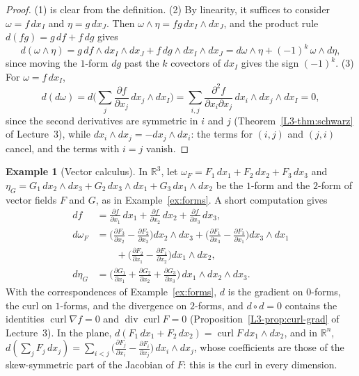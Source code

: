 \documentclass[11pt]{article}
\theoremstyle{definition}
\newtheorem{example}[definition]{Example}
\theoremstyle{plain}
\theoremstyle{remark}
\DeclareMathOperator{\Div}{div}
\DeclareMathOperator{\curl}{curl}
\begin{document}
\begin{proof}
    (1) is clear from the definition. (2) By linearity, it suffices to consider $\omega = f\, dx_I$ and $\eta = g\, dx_J$. Then $\omega \wedge \eta = fg\, dx_I \wedge dx_J$, and the product rule $d(fg) = g\, df + f\, dg$ gives
    \[d(\omega \wedge \eta) = g\, df \wedge dx_I \wedge dx_J + f\, dg \wedge dx_I \wedge dx_J = d\omega \wedge \eta + (-1)^k\, \omega \wedge d\eta,\]
    since moving the $1$-form $dg$ past the $k$ covectors of $dx_I$ gives the sign $(-1)^k$. (3) For $\omega = f\, dx_I$,
    \[d(d\omega) = d\Big(\sum_j \frac{\partial f}{\partial x_j}\, dx_j \wedge dx_I\Big) = \sum_{i,j} \frac{\partial^2 f}{\partial x_i \partial x_j}\, dx_i \wedge dx_j \wedge dx_I = 0,\]
    since the second derivatives are symmetric in $i$ and $j$ (Theorem~\ref{L3-thm:schwarz} of Lecture~3), while $dx_i \wedge dx_j = -dx_j \wedge dx_i$: the terms for $(i, j)$ and $(j, i)$ cancel, and the terms with $i = j$ vanish.
\end{proof}

\begin{example}[Vector calculus]\label{ex:vector-calculus-forms}
    In $\mathbb{R}^3$, let $\omega_F = F_1\, dx_1 + F_2\, dx_2 + F_3\, dx_3$ and $\eta_G = G_1\, dx_2 \wedge dx_3 + G_2\, dx_3 \wedge dx_1 + G_3\, dx_1 \wedge dx_2$ be the $1$-form and the $2$-form of vector fields $F$ and $G$, as in Example~\ref{ex:forms}. A short computation gives
    \begin{align*}
        df &= \tfrac{\partial f}{\partial x_1}\, dx_1 + \tfrac{\partial f}{\partial x_2}\, dx_2 + \tfrac{\partial f}{\partial x_3}\, dx_3, \\
        d\omega_F &= \Big(\tfrac{\partial F_3}{\partial x_2} - \tfrac{\partial F_2}{\partial x_3}\Big) dx_2 \wedge dx_3 + \Big(\tfrac{\partial F_1}{\partial x_3} - \tfrac{\partial F_3}{\partial x_1}\Big) dx_3 \wedge dx_1 \\
        &\qquad + \Big(\tfrac{\partial F_2}{\partial x_1} - \tfrac{\partial F_1}{\partial x_2}\Big) dx_1 \wedge dx_2, \\
        d\eta_G &= \Big(\tfrac{\partial G_1}{\partial x_1} + \tfrac{\partial G_2}{\partial x_2} + \tfrac{\partial G_3}{\partial x_3}\Big)\, dx_1 \wedge dx_2 \wedge dx_3.
    \end{align*}
    With the correspondences of Example~\ref{ex:forms}, $d$ is the gradient on $0$-forms, the curl on $1$-forms, and the divergence on $2$-forms, and $d \circ d = 0$ contains the identities $\curl \nabla f = 0$ and $\Div \curl F = 0$ (Proposition~\ref{L3-prop:curl-grad} of Lecture~3). In the plane, $d(F_1\, dx_1 + F_2\, dx_2) = \curl F\, dx_1 \wedge dx_2$, and in $\mathbb{R}^n$, $d(\sum_j F_j\, dx_j) = \sum_{i < j} \big(\frac{\partial F_j}{\partial x_i} - \frac{\partial F_i}{\partial x_j}\big)\, dx_i \wedge dx_j$, whose coefficients are those of the skew-symmetric part of the Jacobian of $F$: this is the curl in every dimension.
\end{example}
\end{document}
